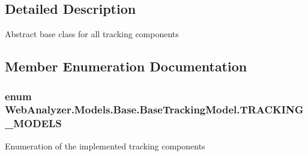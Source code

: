 \subsection{Detailed Description}
Abstract base class for all tracking components 



\subsection{Member Enumeration Documentation}
\hypertarget{class_web_analyzer_1_1_models_1_1_base_1_1_base_tracking_model_a1a4a0f40cfe65595918f6a41023798ff}{}
\subsubsection[{T\+R\+A\+C\+K\+I\+N\+G\+\_\+\+M\+O\+D\+E\+L\+S}]{\setlength{\rightskip}{0pt plus 5cm}enum {\bf Web\+Analyzer.\+Models.\+Base.\+Base\+Tracking\+Model.\+T\+R\+A\+C\+K\+I\+N\+G\+\_\+\+M\+O\+D\+E\+L\+S}\hspace{0.3cm}{\ttfamily [strong]}}\label{class_web_analyzer_1_1_models_1_1_base_1_1_base_tracking_model_a1a4a0f40cfe65595918f6a41023798ff}


Enumeration of the implemented tracking components 

